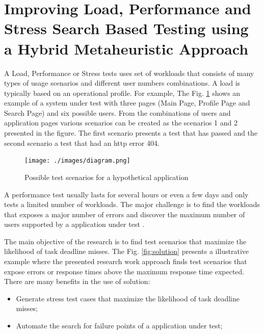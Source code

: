 \section{Improving Load, Performance and Stress Search Based Testing using a Hybrid Metaheuristic Approach}

A  Load, Performance or Stress tests uses set of workloads that consists of many types of usage scenarios and different user numbers combinations. A load is typically based on an operational profile. For example,  The Fig. \ref{fig:example} shows an example  of a system under test with three pages (Main Page, Profile Page and Search Page) and six possible users. From the combinations of users and application pages various scenarios can be created as the scenarios 1 and 2 presented in the figure. The first scenario presents a test that has passed and the second scenario a test that had an http error 404.

\begin{figure}[ht]
\centering
\caption{Possible test scenarios for a hypothetical application}
\texttt{[image: ./images/diagram.png]}
\label{fig:example}
\end{figure}


A performance test usually lasts for several hours or even a few days and only tests a limited number of workloads. The major challenge is to find the workloads  that exposes a major number of errors and discover the maximum number of users supported by a application under test \cite{Barna2011}. 


The main objective of the research is to find test scenarios that maximize the likelihood of task deadline misses. The Fig. \ref{fig:solution} presents a illustrative example where the presented research work approach finds test scenarios that expose errors or response times above the maximum response time expected. There are many benefits in the use of solution:

\begin{itemize}
\item Generate stress test cases that maximize the likelihood of task deadline misses;
\item Automate the search for failure points of a application under test;
\end{itemize}




